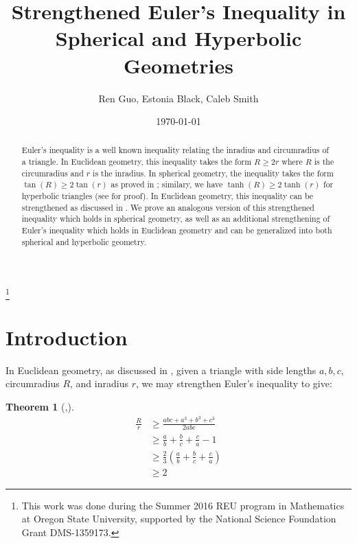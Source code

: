\documentclass[12pt,notitlepage]{amsart}%
\newtheorem{theorem}{Theorem}[section]
\newcommand{\fracsum}{\frac{a}{b}+\frac{b}{c}+\frac{c}{a}}
\begin{document}
\title{Strengthened Euler's Inequality in Spherical and Hyperbolic Geometries}
\author{Ren Guo, Estonia Black, Caleb Smith}
\address{University of Tennessee, Knoxville}
\address{Oregon State University}

\date \today

\thanks{This work was done during the Summer 2016 REU program
in Mathematics at Oregon State University, supported by the National Science Foundation Grant DMS-1359173.}

\begin{abstract}
Euler's inequality is a well known inequality relating the inradius and circumradius of a triangle. In Euclidean geometry, this inequality takes the form $R \geq 2r$ where $R$ is the circumradius and $r$ is the inradius. In spherical geometry, the inequality takes the form $\tan(R) \geq 2\tan(r)$ as proved in \cite{MPV}; similary, we have $\tanh(R) \geq 2\tanh(r)$ for hyperbolic triangles (see \cite{SV} for proof). In Euclidean geometry, this inequality can be strengthened as discussed in \cite{SV}. We prove an analogous version of this strengthened inequality which holds in spherical geometry, as well as an additional strengthening of Euler's inequality which holds in Euclidean geometry and can be generalized into both spherical and hyperbolic geometry.
\end{abstract}

\maketitle
{}


\section{Introduction}
In Euclidean geometry, as discussed in \cite{SV}, given a triangle with side lengths $a,b,c$, circumradius $R$, and inradius $r$, we may strengthen Euler's inequality to give:
\begin{theorem}[\cite{SU},\cite{VW}]\label{original}
\begin{subequations}
	\begin{align} 
	\frac{R}{r} &\geq \frac{abc + a^3+b^3+c^3}{2abc} \label{originalA} \\ 
			&\geq \fracsum - 1 \label{originalB} \\ 	
			&\geq \frac{2}{3} \left( \fracsum\right) \label{originalC} \\ 
			&\geq 2 \label{originalD} 
	\end{align} 
\end{subequations} 
\end{theorem}
\end{document}
